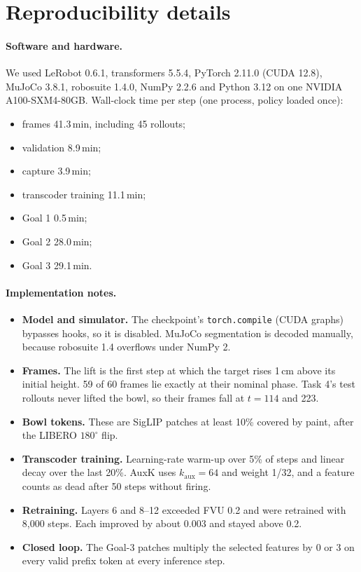 \documentclass{article} %
\begin{document}
\appendix
\section{Reproducibility details}
\label{app:repro}
\paragraph{Software and hardware.} We used LeRobot 0.6.1, transformers 5.5.4, PyTorch 2.11.0 (CUDA 12.8), MuJoCo 3.8.1, robosuite 1.4.0, NumPy 2.2.6 and Python 3.12 on one NVIDIA A100-SXM4-80GB. Wall-clock time per step (one process, policy loaded once):
\begin{itemize}[leftmargin=*,itemsep=0pt,topsep=1pt]
  \item frames 41.3\,min, including 45 rollouts;
  \item validation 8.9\,min;
  \item capture 3.9\,min;
  \item transcoder training 11.1\,min;
  \item Goal 1 0.5\,min;
  \item Goal 2 28.0\,min;
  \item Goal 3 29.1\,min.
\end{itemize}

\paragraph{Implementation notes.}
\begin{itemize}[leftmargin=*,itemsep=0pt,topsep=1pt]
  \item \textbf{Model and simulator.} The checkpoint's \texttt{torch.compile} (CUDA graphs) bypasses hooks, so it is disabled. MuJoCo segmentation is decoded manually, because robosuite 1.4 overflows under NumPy 2.
  \item \textbf{Frames.} The lift is the first step at which the target rises 1\,cm above its initial height. 59 of 60 frames lie exactly at their nominal phase. Task 4's test rollouts never lifted the bowl, so their frames fall at $t{=}114$ and 223.
  \item \textbf{Bowl tokens.} These are SigLIP patches at least 10\% covered by paint, after the LIBERO $180^\circ$ flip.
  \item \textbf{Transcoder training.} Learning-rate warm-up over 5\% of steps and linear decay over the last 20\%. AuxK uses $k_{\text{aux}}{=}64$ and weight 1/32, and a feature counts as dead after 50 steps without firing.
  \item \textbf{Retraining.} Layers 6 and 8--12 exceeded FVU 0.2 and were retrained with 8,000 steps. Each improved by about 0.003 and stayed above 0.2.
  \item \textbf{Closed loop.} The Goal-3 patches multiply the selected features by 0 or 3 on every valid prefix token at every inference step.
\end{itemize}
\end{document}
